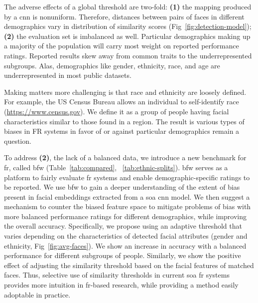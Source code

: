 The adverse effects of a global threshold are two-fold: \textbf{(1)} the mapping produced by a \gls{cnn} is nonuniform. Therefore, distances between pairs of faces in different demographics vary in distribution of similarity scores (Fig~\ref{fig:detection-model}); \textbf{(2)} the evaluation set is imbalanced as well. Particular demographics making up a majority of the population will carry most weight on reported performance ratings. Reported results skew away from common traits to the underrepresented subgroups. Alas, demographics like gender, ethnicity, race, and age are underrepresented in most public datasets. 

Making matters more challenging is that race and ethnicity are loosely defined.  For example, the US Census Bureau allows an individual to self-identify race (\href{https://www.census.gov/mso/www/training/pdf/race-ethnicity-onepager.pdf}{https://www.census.gov}). We define it as a group of people having facial characteristics similar to those found in a region. The result is various types of biases in FR systems in favor of or against particular demographics remain a question.



To address \textbf{(2)}, the lack of a balanced data, we introduce a new benchmark for \gls{fr}, called \gls{bfw} (Table~\ref{tab:compared}, ~\ref{tab:ethnic-splits}). \gls{bfw} serves as a platform to fairly evaluate \gls{fr} systems and enable demographic-specific ratings to be reported. We use \gls{bfw} to gain a deeper understanding of the extent of bias present in facial embeddings extracted from a \gls{soa} \gls{cnn} model. We then suggest a mechanism to counter the biased feature space to mitigate problems of bias with more balanced performance ratings for different demographics, while improving the overall accuracy. Specifically, we propose using an adaptive threshold that varies depending on the characteristics of detected facial attributes (\ie gender and ethnicity, Fig~\ref{fig:avg-faces}). We show an increase in accuracy with a balanced performance for different subgroups of people. Similarly, we show the positive effect of adjusting the similarity threshold based on the facial features of matched faces. Thus, selective use of similarity thresholds in current \gls{soa} \gls{fr} systems provides more intuition in \gls{fr}-based research, while providing a method easily adoptable in practice. 



